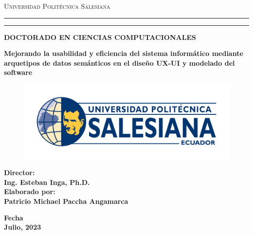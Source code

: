 \newcommand\patTitulo
    { Mejorando la usabilidad y eficiencia del sistema informático mediante arquetipos de datos semánticos en el diseño UX-UI y modelado del software}
\newcommand\patTituloMayus
    {{\textsc \patTitulo}}
\newcommand\patNombre
    {Patricio Michael Paccha Angamarca}
\newcommand\patKeywords
    {Semantic data archetypes, UX-UI design, Software modeling, Software design pattern}

     \thispagestyle{empty}%
 \begin{titlepage}
    \begin{center}

{{\Large{\textsc{Universidad Politécnica Salesiana}}}} \rule[0.1cm]{16cm}{0.1mm}
\rule[0.5cm]{16cm}{0.6mm}
{\Large{\bf 
    DOCTORADO EN CIENCIAS COMPUTACIONALES 
}}
\end{center}
\vspace{15mm}
\begin{center}
{\LARGE{\bf 
    \patTituloMayus
}}\\
\vspace{6mm}
\end{center}
\vspace{22mm}
\par
\noindent

\begin{figure}
\begin{center}
\includegraphics[scale=0.3]{logoups.png}
\vspace{-0.2cm} 
\end{center}
\end{figure}


\begin{minipage}[t]{0.57\textwidth}
{\large{\bf Director:\\
    Ing. Esteban Inga, Ph.D. \\
{\vskip 5mm} Elaborado por:\\
    \patNombre
}}
\end{minipage}
\hfill
\vspace{10mm}
\begin{center}
{\large{\bf 
    Fecha\\
    Julio, 2023 }}%
\end{center}
\end{titlepage}
